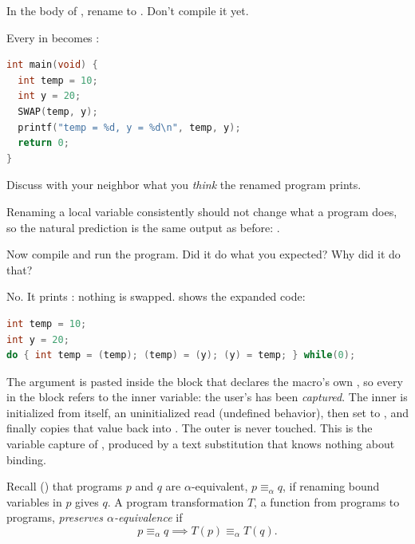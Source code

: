 \begin{exercise}
In the body of , rename  to . Don't compile it yet.
\end{exercise}
\begin{solution}
Every  in  becomes :
\begin{lstlisting}[language=C]
int main(void) {
  int temp = 10;
  int y = 20;
  SWAP(temp, y);
  printf("temp = %d, y = %d\n", temp, y);
  return 0;
}
\end{lstlisting}
\end{solution}

\begin{exercise}
Discuss with your neighbor what you \emph{think} the renamed program prints.
\end{exercise}
\begin{solution}
Renaming a local variable consistently should not change what a program does, so the natural prediction is the same output as before: .
\end{solution}

\begin{exercise}
Now compile and run the program. Did it do what you expected? Why did it do that?
\end{exercise}
\begin{solution}
No. It prints : nothing is swapped.  shows the expanded code:
\begin{lstlisting}[language=C]
int temp = 10;
int y = 20;
do { int temp = (temp); (temp) = (y); (y) = temp; } while(0);
\end{lstlisting}
The argument  is pasted inside the block that declares the macro's own , so every  in the block refers to the inner variable: the user's  has been \emph{captured}. The inner  is initialized from itself, an uninitialized read (undefined behavior), then set to , and finally  copies that value back into . The outer  is never touched. This is the variable capture of , produced by a text substitution that knows nothing about binding.
\end{solution}

\begin{definition}
Recall () that programs $p$ and $q$ are $\alpha$-equivalent, $p \equiv_\alpha q$, if renaming bound variables in $p$ gives $q$. A program transformation $T$, a function from programs to programs, \emph{preserves $\alpha$-equivalence} if
\[
  p \equiv_\alpha q \implies T(p) \equiv_\alpha T(q).
\]
\end{definition}

